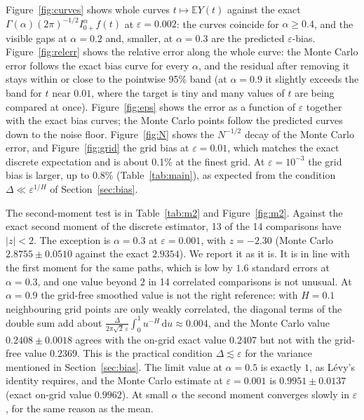 \documentclass[11pt]{article}
\theoremstyle{remark}
\theoremstyle{definition}
\newcommand{\E}{\mathbb{E}}
\newcommand{\dd}{\,\mathrm{d}}
\newcommand{\Ia}{I^{\alpha}_{0+}}
\begin{document}
Figure~\ref{fig:curves} shows whole curves $t\mapsto\E Y(t)$ against the exact $\Gamma(\alpha)(2\pi)^{-1/2}\Ia f(t)$ at $\varepsilon=0.002$: the curves coincide for $\alpha\ge0.4$, and the visible gaps at $\alpha=0.2$ and, smaller, at $\alpha=0.3$ are the predicted $\varepsilon$-bias. Figure~\ref{fig:relerr} shows the relative error along the whole curve: the Monte Carlo error follows the exact bias curve for every $\alpha$, and the residual after removing it stays within or close to the pointwise 95\% band (at $\alpha=0.9$ it slightly exceeds the band for $t$ near $0.01$, where the target is tiny and many values of $t$ are being compared at once). Figure~\ref{fig:eps} shows the error as a function of $\varepsilon$ together with the exact bias curves; the Monte Carlo points follow the predicted curves down to the noise floor. Figure~\ref{fig:N} shows the $N^{-1/2}$ decay of the Monte Carlo error, and Figure~\ref{fig:grid} the grid bias at $\varepsilon=0.01$, which matches the exact discrete expectation and is about 0.1\% at the finest grid. At $\varepsilon=10^{-3}$ the grid bias is larger, up to 0.8\% (Table~\ref{tab:main}), as expected from the condition $\Delta\ll\varepsilon^{1/H}$ of Section~\ref{sec:bias}.

The second-moment test is in Table~\ref{tab:m2} and Figure~\ref{fig:m2}. Against the exact second moment of the discrete estimator, 13 of the 14 comparisons have $|z|<2$. The exception is $\alpha=0.3$ at $\varepsilon=0.001$, with $z=-2.30$ (Monte Carlo $2.8755\pm0.0510$ against the exact $2.9354$). We report it as it is. It is in line with the first moment for the same paths, which is low by $1.6$ standard errors at $\alpha=0.3$, and one value beyond $2$ in 14 correlated comparisons is not unusual. At $\alpha=0.9$ the grid-free smoothed value is not the right reference: with $H=0.1$ neighbouring grid points are only weakly correlated, the diagonal terms of the double sum add about $\frac{\Delta}{2\pi\sqrt2\,\varepsilon}\int_0^1u^{-H}\dd u\approx0.004$, and the Monte Carlo value $0.2408\pm0.0018$ agrees with the on-grid exact value $0.2407$ but not with the grid-free value $0.2369$. This is the practical condition $\Delta\lesssim\varepsilon$ for the variance mentioned in Section~\ref{sec:bias}. The limit value at $\alpha=0.5$ is exactly $1$, as L\'evy's identity requires, and the Monte Carlo estimate at $\varepsilon=0.001$ is $0.9951\pm0.0137$ (exact on-grid value $0.9962$). At small $\alpha$ the second moment converges slowly in $\varepsilon$, for the same reason as the mean.
\end{document}
